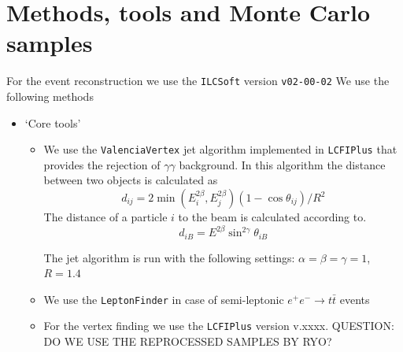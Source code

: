 \documentclass[preprint]{elsarticle}
\begin{document}
\section{Methods, tools and Monte Carlo samples}

For the event reconstruction we use the \texttt{ILCSoft} version \texttt{v02-00-02} 
We use the following methods
\begin{itemize}

\item `Core tools'
  \begin{itemize}
  \item We use the \texttt{ValenciaVertex} jet algorithm implemented in \texttt{LCFIPlus} that provides the rejection of $\gamma\gamma$ background. In this algorithm the distance between two objects is calculated as  
  \begin{equation}
d_{ij} = 2 \min(E^{2\beta}_{i}, E^{2\beta}_{j}) (1-\cos \theta_{ij})/R^2
  \end{equation}
The distance of a particle $i$ to the beam is calculated according to.
  \begin{equation}
d_{iB} = E^{2\beta} \sin^{2\gamma}\theta_{iB}
  \end{equation}

  The jet algorithm is run with the following settings: $\alpha=\beta=\gamma=1$, $R=1.4$ 
  \item We use the \texttt{LeptonFinder} in case of semi-leptonic $e^+e^-\rightarrow t\bar{t}$ events
  \item For the vertex finding we use the \texttt{LCFIPlus} version v.xxxx. QUESTION: DO WE USE THE REPROCESSED SAMPLES BY RYO?
  \end{itemize}


\end{itemize}
\end{document}
